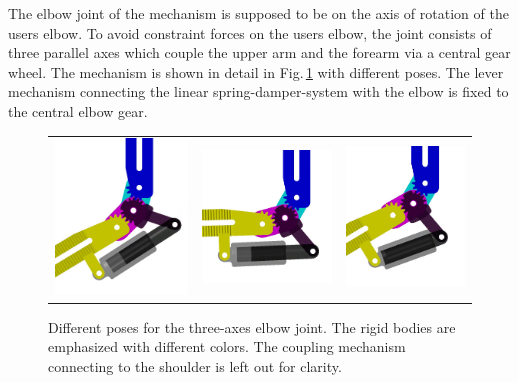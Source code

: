 \documentclass[letterpaper, 10 pt, conference]{ieeeconf}  %
\begin{document}
The elbow joint of the mechanism is supposed to be on the axis of rotation of the users elbow.
To avoid constraint forces on the users elbow, the joint consists of three parallel axes which couple the upper arm and the forearm via a central gear wheel. The mechanism is shown in detail in Fig.\,\ref{fig:EllenbogenSimMech} with different poses.
The lever mechanism connecting the linear spring-damper-system with the elbow is fixed to the central elbow gear.

\begin{figure}[tb!]
    \begin{tabular}{c c c}
        \includegraphics[width=0.28\linewidth]{figures/KAS6m3_SimMech_1.png} &
        \includegraphics[width=0.30\linewidth]{figures/KAS6m3_SimMech_2.png} &
        \includegraphics[width=0.28\linewidth]{figures/KAS6m3_SimMech_3.png}
    \end{tabular}

    \caption{Different poses for the three-axes elbow joint. The rigid bodies are emphasized with different colors. The coupling mechanism connecting to the shoulder is left out for clarity.}
    \label{fig:EllenbogenSimMech}
\end{figure} 
\end{document}
